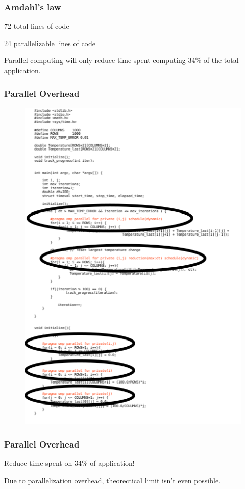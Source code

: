 \begin{frame}
		\frametitle{Amdahl's law}
		72 total lines of code 

		24 parallelizable lines of code


		\color{red}Parallel computing will only reduce time spent computing
		34\% of the total application.
\end{frame}

\begin{frame}
		\frametitle{Parallel Overhead}
		\begin{figure}
				\includegraphics[width=0.4\linewidth]{figures/diagrams/amdahl/overhead}
		\end{figure}
\end{frame}

\begin{frame}
		\frametitle{Parallel Overhead}
		\sout{Reduce time spent on 34\% of application!}\newline

		\color{red}Due to parallelization overhead, theorectical limit isn't
even possible.
\end{frame}

